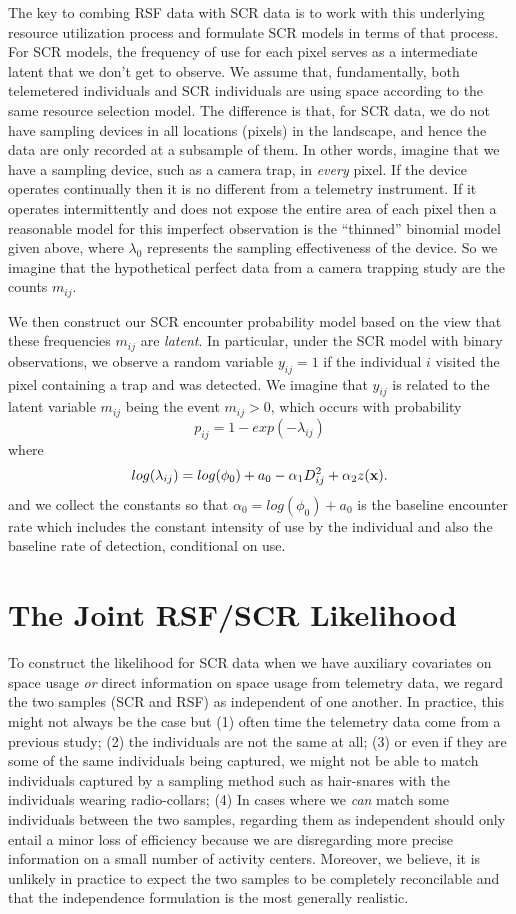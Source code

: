 The key to combing RSF data with SCR data is to work with this
underlying resource utilization process and formulate SCR models in
terms of that process. For SCR models, the frequency of use for each pixel
serves as a intermediate
latent that we don't get to observe. We assume that, fundamentally,
both telemetered individuals and SCR individuals are using space
according to the same resource selection model. The difference is that,
for SCR data, we 
do not have sampling devices in all locations (pixels) in the landscape, and hence the
data are only recorded at a subsample of them.
In other words, imagine that we have a sampling device, such as a
camera trap, in {\it every} pixel. If the device operates continually
then it is no different from a telemetry instrument. If it
operates  intermittently and does not expose the entire area of
each pixel then a reasonable model for this imperfect observation is
the ``thinned'' binomial model given above, where $\lambda_{0}$
represents the sampling effectiveness of the device. So we imagine
that the hypothetical perfect data from a camera trapping study are
the counts $m_{ij}$.

We then construct our SCR encounter probability model based on the
view that these frequencies $m_{ij}$ are {\it latent}. In particular,
under the SCR model with binary observations,
 we observe a random variable
$y_{ij} = 1$  if the individual $i$ visited the pixel
containing a trap and was detected.
We imagine that $y_{ij}$ is related to the latent variable $m_{ij}$ being the
event $m_{ij}>0$, which occurs with probability
\[
 p_{ij} = 1-exp(- \lambda_{ij})
\]
where 
\[
 log(\lambda_{ij}) = log(\phi_{0}) + a_{0} -\alpha_{1} D_{ij}^{2} +  \alpha_{2} z({\bf x}).
\]
and we collect the constants so that $\alpha_{0} = log(\phi_{0}) +
a_{0}$ is the 
 baseline encounter rate which includes
the constant intensity of use by the individual and also the baseline
rate of detection, conditional on use.



\section{The Joint RSF/SCR Likelihood}

To construct the likelihood for SCR data when we have auxiliary
covariates on space usage {\it or} direct information on space usage
from telemetry data, we regard the two samples (SCR and RSF) as
independent of one another. In practice, this might not always be the
case but (1) often time the telemetry data come from a previous study;
(2) the individuals are not the same at all; (3) or even if they are
some of the same individuals being captured, we might not be able to
match individuals captured by a sampling method such as hair-snares
with the individuals wearing radio-collars; (4) In cases where we {\it
  can} match some individuals between the two samples, regarding them as
independent should only entail a minor
loss of efficiency
because we are disregarding more precise information on a small number
of activity centers. Moreover, we believe, it is unlikely in practice
to expect the two samples to be completely reconcilable and that the
independence formulation is the most generally realistic.

